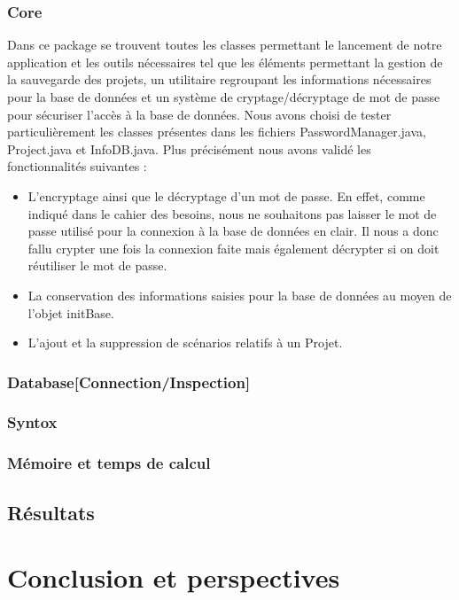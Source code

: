 \documentclass[12pt]{report}
\begin{document}
\subsection{Core}
	Dans ce package se trouvent toutes les classes permettant le lancement de notre application et les outils nécessaires tel que les éléments permettant la gestion de la sauvegarde des projets, un utilitaire regroupant les informations nécessaires pour la base de données et un système de cryptage/décryptage de mot de passe pour sécuriser l'accès à la base de données. 
Nous avons choisi de tester particulièrement les classes présentes dans les fichiers PasswordManager.java, Project.java et InfoDB.java. Plus précisément nous avons validé les fonctionnalités suivantes :
	\begin{itemize}
	\item L'encryptage ainsi que le décryptage d'un mot de passe. En effet, comme indiqué dans le cahier des besoins, nous ne souhaitons pas laisser le mot de passe utilisé pour la connexion à la base de données en clair. Il nous a donc fallu crypter une fois la connexion faite mais également décrypter si on doit réutiliser le mot de passe.
	\item La conservation des informations saisies pour la base de données au moyen de l'objet initBase. 
	\item L'ajout et la suppression de scénarios relatifs à un Projet.
	\end{itemize}
\subsection{Database[Connection/Inspection]}
\subsection{Syntox}

\subsection{Mémoire et temps de calcul}
	
\section{Résultats}

\chapter{Conclusion et perspectives}




\end{document}
